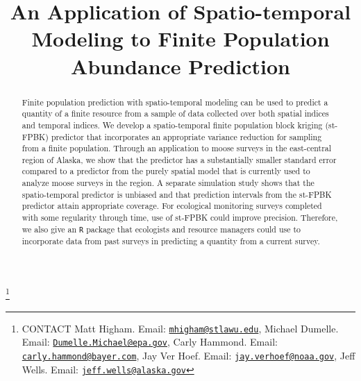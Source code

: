 \documentclass[]{interact}
\theoremstyle{plain}%
\theoremstyle{definition}
\theoremstyle{remark}
\begin{document}

\title{An Application of Spatio-temporal Modeling to Finite Population
Abundance Prediction}


\author{
}

\thanks{CONTACT Matt
Higham. Email: \href{mailto:mhigham@stlawu.edu}{\nolinkurl{mhigham@stlawu.edu}}, Michael
Dumelle. Email: \href{mailto:Dumelle.Michael@epa.gov}{\nolinkurl{Dumelle.Michael@epa.gov}}, Carly
Hammond. Email: \href{mailto:carly.hammond@bayer.com}{\nolinkurl{carly.hammond@bayer.com}}, Jay
Ver
Hoef. Email: \href{mailto:jay.verhoef@noaa.gov}{\nolinkurl{jay.verhoef@noaa.gov}}, Jeff
Wells. Email: \href{mailto:jeff.wells@alaska.gov}{\nolinkurl{jeff.wells@alaska.gov}}}

\maketitle

\begin{abstract}
Finite population prediction with spatio-temporal modeling can be used
to predict a quantity of a finite resource from a sample of data
collected over both spatial indices and temporal indices. We develop a
spatio-temporal finite population block kriging (st-FPBK) predictor that
incorporates an appropriate variance reduction for sampling from a
finite population. Through an application to moose surveys in the
east-central region of Alaska, we show that the predictor has a
substantially smaller standard error compared to a predictor from the
purely spatial model that is currently used to analyze moose surveys in
the region. A separate simulation study shows that the spatio-temporal
predictor is unbiased and that prediction intervals from the st-FPBK
predictor attain appropriate coverage. For ecological monitoring surveys
completed with some regularity through time, use of st-FPBK could
improve precision. Therefore, we also give an \texttt{R} package that
ecologists and resource managers could use to incorporate data from past
surveys in predicting a quantity from a current survey.
\end{abstract}
\end{document}
